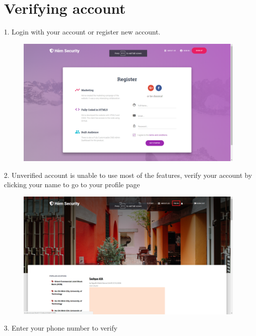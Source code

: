 \section{Verifying account}
1. Login with your account or register new account. 
\begin{center}
	\begin{figure}[H]
		\centering
		\includegraphics[width=1\columnwidth]{images/chap6/instruction1.png}
		\label{}
	\end{figure}
\end{center}
2. Unverified account is unable to use most of the features, verify your account by clicking your name to go to your profile page
\begin{center}
	\begin{figure}[H]
		\centering
		\includegraphics[width=1\columnwidth]{images/chap6/instruction2.png}
	\end{figure}
\end{center}
3. Enter your phone number to verify
